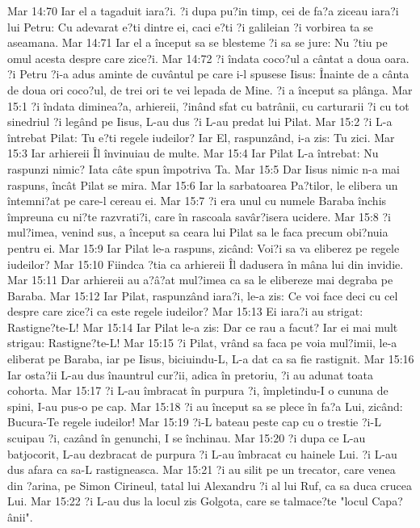 Mar 14:70  Iar el a tagaduit iara?i. ?i dupa pu?in timp, cei de fa?a ziceau iara?i lui Petru: Cu adevarat e?ti dintre ei, caci e?ti ?i galileian ?i vorbirea ta se aseamana.
Mar 14:71  Iar el a început sa se blesteme ?i sa se jure: Nu ?tiu pe omul acesta despre care zice?i.
Mar 14:72  ?i îndata coco?ul a cântat a doua oara. ?i Petru ?i-a adus aminte de cuvântul pe care i-l spusese Iisus: Înainte de a cânta de doua ori coco?ul, de trei ori te vei lepada de Mine. ?i a început sa plânga.
Mar 15:1  ?i îndata diminea?a, arhiereii, ?inând sfat cu batrânii, cu carturarii ?i cu tot sinedriul ?i legând pe Iisus, L-au dus ?i L-au predat lui Pilat.
Mar 15:2  ?i L-a întrebat Pilat: Tu e?ti regele iudeilor? Iar El, raspunzând, i-a zis: Tu zici.
Mar 15:3  Iar arhiereii Îl învinuiau de multe.
Mar 15:4  Iar Pilat L-a întrebat: Nu raspunzi nimic? Iata câte spun împotriva Ta.
Mar 15:5  Dar Iisus nimic n-a mai raspuns, încât Pilat se mira.
Mar 15:6  Iar la sarbatoarea Pa?tilor, le elibera un întemni?at pe care-l cereau ei.
Mar 15:7  ?i era unul cu numele Baraba închis împreuna cu ni?te razvrati?i, care în rascoala savâr?isera ucidere.
Mar 15:8  ?i mul?imea, venind sus, a început sa ceara lui Pilat sa le faca precum obi?nuia pentru ei.
Mar 15:9  Iar Pilat le-a raspuns, zicând: Voi?i sa va eliberez pe regele iudeilor?
Mar 15:10  Fiindca ?tia ca arhiereii Îl dadusera în mâna lui din invidie.
Mar 15:11  Dar arhiereii au a?â?at mul?imea ca sa le elibereze mai degraba pe Baraba.
Mar 15:12  Iar Pilat, raspunzând iara?i, le-a zis: Ce voi face deci cu cel despre care zice?i ca este regele iudeilor?
Mar 15:13  Ei iara?i au strigat: Rastigne?te-L!
Mar 15:14  Iar Pilat le-a zis: Dar ce rau a facut? Iar ei mai mult strigau: Rastigne?te-L!
Mar 15:15  ?i Pilat, vrând sa faca pe voia mul?imii, le-a eliberat pe Baraba, iar pe Iisus, biciuindu-L, L-a dat ca sa fie rastignit.
Mar 15:16  Iar osta?ii L-au dus înauntrul cur?ii, adica în pretoriu, ?i au adunat toata cohorta.
Mar 15:17  ?i L-au îmbracat în purpura ?i, împletindu-I o cununa de spini, I-au pus-o pe cap.
Mar 15:18  ?i au început sa se plece în fa?a Lui, zicând: Bucura-Te regele iudeilor!
Mar 15:19  ?i-L bateau peste cap cu o trestie ?i-L scuipau ?i, cazând în genunchi, I se închinau.
Mar 15:20  ?i dupa ce L-au batjocorit, L-au dezbracat de purpura ?i L-au îmbracat cu hainele Lui. ?i L-au dus afara ca sa-L rastigneasca.
Mar 15:21  ?i au silit pe un trecator, care venea din ?arina, pe Simon Cirineul, tatal lui Alexandru ?i al lui Ruf, ca sa duca crucea Lui.
Mar 15:22  ?i L-au dus la locul zis Golgota, care se talmace?te "locul Capa?ânii".
